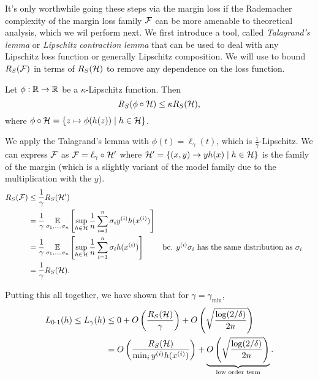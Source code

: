 It's only worthwhile going these steps via the margin loss if the Rademacher complexity of the margin loss family $\mathcal F$ can be more amenable to theoretical analysis, which we wil perform next.  We first introduce a tool, called \textit{Talagrand's lemma} or \textit{Lipschitz contraction lemma} that can be used to deal with any Lipschitz loss function or generally Lipschitz composition. We will use to bound $R_S(\mathcal F)$ in terms of $R_S(\mathcal H)$ to remove any dependence on the loss function. 
 
\begin{lemma} \label{lec6:lem:talagrand_lemma}
Let $\phi:\mathbb R\to\mathbb R$ be a $\kappa$-Lipschitz function. Then \begin{equation}
    R_S(\phi\circ \mathcal H)\leq \kappa R_S(\mathcal H),
\end{equation} 
where $\phi\circ\mathcal H = \{z\mapsto \phi(h(z))\mid h\in\mathcal H\}$.
\end{lemma}

We apply the Talagrand's lemma with $\phi(t) = \ell_\gamma(t)$, which is $\frac{1}{\gamma}$-Lipschitz. We can express $\mathcal F$ as $\mathcal F=\ell_\gamma\circ\mathcal H'$ where $\mathcal H' = \{(x,y)\to yh(x)\mid h\in\mathcal H\}$ is the family of the margin (which is a slightly variant of the model family due to the multiplication with the $y$). 
\begin{align}
R_S(\mathcal F) &\leq \frac{1}{\gamma}R_S(\mathcal H') \\
&= \frac{1}{\gamma}\operatorname*{\mathbb{E}}_{\sigma_1,\dots, \sigma_n} \left[ \sup_{h\in \mathcal H} \frac{1}{n} \sum^n_{i=1} \sigma_i y^{(i)}h(x^{(i)}) \right] \\
&= \frac{1}{\gamma}\operatorname*{\mathbb{E}}_{\sigma_1,\dots, \sigma_n} \left[ \sup_{h\in \mathcal H} \frac{1}{n} \sum^n_{i=1} \sigma_i h(x^{(i)})  \right] && \text{bc. $y^{(i)}\sigma_i$ has the same distribution as $\sigma_i$ }\\
&= \frac{1}{\gamma}R_S(\mathcal H).
\end{align}

Putting this all together, we have shown that for $\gamma = \gamma_{\min}$,
\begin{align}
L_{\textup{0-1}}(h) \leq L_\gamma(h) &\leq 0 + O \left( \frac{R_S(\mathcal H)}{\gamma} \right) + O \left( \sqrt{\frac{\log (2 / \delta)}{2n}} \right) \\
&= O \left( \frac{R_S(\mathcal H)}{\min_i y^{(i)} h(x^{(i)}) } \right) + \underbrace{O \left( \sqrt{\frac{\log (2 / \delta)}{2n}} \right)}_{\textup{low order term}}.
\end{align}


